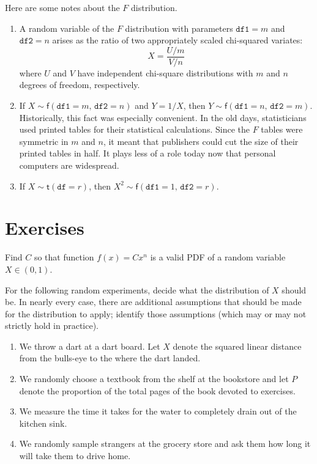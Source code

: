 \begin{rem}
Here are some notes about the \(F\) distribution.
\begin{enumerate}
\item
A random variable of the $F$ distribution with parameters $\mathtt{df1}=m$ and $\mathtt{df2}=n$ arises as the ratio of two appropriately scaled chi-squared variates:
\[ X=\frac{U/m}{V/n} \]
where $U$ and $V$ have independent chi-square distributions with $m$ and $n$ degrees of freedom, respectively.
\item If \(X\sim\mathsf{f}(\mathtt{df1}=m,\,\mathtt{df2}=n)\) and
\(Y=1/X\), then
\(Y\sim\mathsf{f}(\mathtt{df1}=n,\,\mathtt{df2}=m)\). Historically,
this fact was especially convenient. In the old days, statisticians
used printed tables for their statistical calculations. Since the
\(F\) tables were symmetric in \(m\) and \(n\), it meant that
publishers could cut the size of their printed tables in half. It
plays less of a role today now that personal computers are
widespread.
\item If \(X\sim\mathsf{t}(\mathtt{df}=r)\), then
\(X^{2}\sim\mathsf{f}(\mathtt{df1}=1,\,\mathtt{df2}=r)\).
\end{enumerate}
\end{rem}

\newpage{}

\section{Exercises}
\label{sec-6-6}
\setcounter{thm}{0}

\begin{xca}
Find \(C\) so that function $f(x) = Cx^{n}$ is a valid PDF of a random variable $X\in(0, 1)$.
\end{xca}

\begin{xca}
For the following random experiments, decide what the distribution of
\(X\) should be. In nearly every case, there are additional
assumptions that should be made for the distribution to apply;
identify those assumptions (which may or may not strictly hold in
practice).
\begin{enumerate}
\item We throw a dart at a dart board. Let \(X\) denote the squared
linear distance from the bulls-eye to the where the dart landed.
\item We randomly choose a textbook from the shelf at the bookstore and
let \(P\) denote the proportion of the total pages of the book
devoted to exercises.
\item We measure the time it takes for the water to completely drain out
of the kitchen sink.
\item We randomly sample strangers at the grocery store and ask them how
long it will take them to drive home.
\end{enumerate}
\end{xca}

